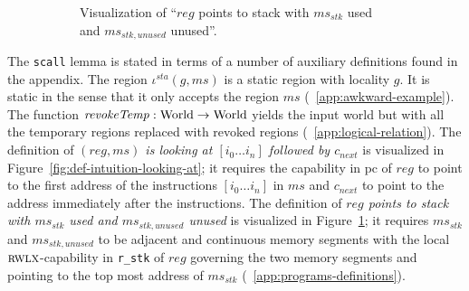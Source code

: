 \documentclass[format=acmsmall, review=true, screen=true]{acmart}
\renewcommand{\figurename}{Figure}
\newcommand{\fun}{\rightarrow}
\newcommand{\var}[1]{\mathit{#1}}
\newcommand{\hs}{\var{ms}}
\newcommand{\ms}{\hs}
\newcommand{\gl}{\var{g}}
\newcommand{\pcreg}{\mathrm{pc}}
\newcommand{\reg}{\var{reg}}
\newcommand{\stk}{\var{stk}}
\newcommand{\plainfun}[2]{
  \ifthenelse{\equal{#2}{}}
  {\mathit{#1}}
  {\mathit{#1}(#2)}
}
\newcommand{\revokeTemp}[1]{\plainfun{revokeTemp}{#1}}
\newcommand{\plaindom}[1]{\mathrm{#1}}
\newcommand{\Worlds}{\plaindom{World}}
\newcommand{\plainperm}[1]{\textsc{#1}}
\newcommand{\rwlx}{\plainperm{rwlx}}
\newenvironment{toplas}%
    {\color{OliveGreen}}{}
\begin{document}
\begin{toplas}
\begin{figure}[htb]
\begin{subfigure}{0.43\linewidth}
    \caption{Visualization of ``$\reg$ points to stack with $\ms_\stk$ used and
      $\ms_{\stk,\var{unused}}$ unused''.}
  \label{fig:def-intuition-points-to-stack}
  \end{subfigure}

  \caption{
  }
  \label{fig:def-intuition}
\end{figure}
\begin{toplas}
The \texttt{scall} lemma is stated in terms of a number of auxiliary definitions
found in the appendix. The region $\iota^{sta}(\gl,\ms)$ is a static region with
locality $\gl$. It is static in the sense that it only accepts the region $\ms$
(\appendixname~\ref{app:awkward-example}).
The function $\revokeTemp{} : \Worlds \fun \Worlds$ yields the input world but
with all the temporary regions replaced with revoked regions (\appendixname~\ref{app:logical-relation}). The definition of \textit{$(\reg,\ms)$ is looking at $[i_0\dots i_n]$
      followed by $c_{\var{next}}$} is visualized in
    \figurename~\ref{fig:def-intuition-looking-at};
    it requires the capability in $\pcreg$ of
    $\reg$ to point to the first address of the instructions $[i_0\dots i_n]$ in
    $\ms$ and $c_{\var{next}}$ to point to the address immediately after the
    instructions. The definition of \textit{$\reg$ points to stack with $\ms_\stk$ used and
      $\ms_{\stk,\var{unused}}$ unused} is visualized in
    \figurename~\ref{fig:def-intuition-points-to-stack};
    it requires $\ms_\stk$ and $\ms_{\stk,\var{unused}}$ to be adjacent and
    continuous memory segments with the local $\rwlx$-capability in
    \texttt{r\_stk} of $\reg$ governing the two memory segments and pointing to
    the top most address of $\ms_\stk$ (\appendixname~\ref{app:programs-definitions}).
\end{toplas}


\end{toplas}
\end{document}
